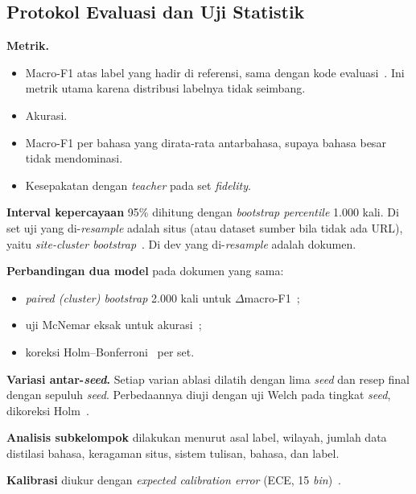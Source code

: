\documentclass[journal]{IEEEtran}
\newcommand{\eng}[1]{\textit{#1}}   %
\begin{document}
\subsection{Protokol Evaluasi dan Uji Statistik}
\label{sec:protocol}
\textbf{Metrik.}
\begin{itemize}
  \item Macro-F1 atas label yang hadir di referensi, sama dengan kode evaluasi~\cite{kuzman2025llm}. Ini metrik utama karena distribusi labelnya tidak seimbang.
  \item Akurasi.
  \item Macro-F1 per bahasa yang dirata-rata antarbahasa, supaya bahasa besar tidak mendominasi.
  \item Kesepakatan dengan \eng{teacher} pada set \eng{fidelity}.
\end{itemize}

\textbf{Interval kepercayaan} 95\% dihitung dengan \eng{bootstrap percentile} 1.000 kali. Di set uji yang di-\eng{resample} adalah situs (atau dataset sumber bila tidak ada URL), yaitu \eng{site-cluster bootstrap}~\cite{field2007bootstrapping}. Di dev yang di-\eng{resample} adalah dokumen.

\textbf{Perbandingan dua model} pada dokumen yang sama:
\begin{itemize}
  \item \eng{paired (cluster) bootstrap} 2.000 kali untuk $\Delta$macro-F1~\cite{koehn2004significance};
  \item uji McNemar eksak untuk akurasi~\cite{mcnemar1947};
  \item koreksi Holm--Bonferroni~\cite{holm1979} per set.
\end{itemize}

\textbf{Variasi antar-\eng{seed}.} Setiap varian ablasi dilatih dengan lima \eng{seed} dan resep final dengan sepuluh \eng{seed}. Perbedaannya diuji dengan uji Welch pada tingkat \eng{seed}, dikoreksi Holm~\cite{hagmann2023inferential}.

\textbf{Analisis subkelompok} dilakukan menurut asal label, wilayah, jumlah data distilasi bahasa, keragaman situs, sistem tulisan, bahasa, dan label.

\textbf{Kalibrasi} diukur dengan \eng{expected calibration error} (ECE, 15 \eng{bin})~\cite{guo2017calibration}.
\end{document}
